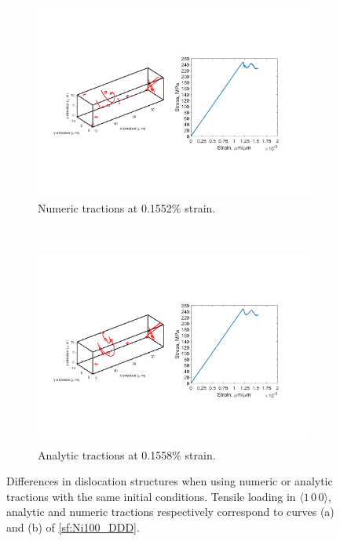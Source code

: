 \begin{figure}
    \begin{subfigure}[t]{0.45\linewidth}
        \centering
        \includegraphics[trim={1.75cm 6.75cm 15.75cm 6.75cm},clip,width=\linewidth]{../data/11-Mar-2021_numT_8_tensile_ni_100_98400.pdf}
        \caption{Numeric tractions at 0.1552\% strain.}
    \end{subfigure}
    ~
    \begin{subfigure}[t]{0.45\linewidth}
        \centering
        \includegraphics[trim={1.75cm 6.75cm 15.75cm 6.75cm},clip,width=\linewidth]{../data/11-Mar-2021_8_tensile_ni_100_120000.pdf}
        \caption{Analytic tractions at 0.1558\% strain.}
    \end{subfigure}
    \caption[Differences in dislocation structures when using numeric or analytic tractions with the same initial conditions.]{Differences in dislocation structures when using numeric or analytic tractions with the same initial conditions. Tensile loading in $\langle 1\, 0\, 0 \rangle$, analytic and numeric tractions respectively correspond to curves (a) and (b) of \cref{sf:Ni100_DDD}.}
    \label{f:analyticNumericStruct}
\end{figure}

